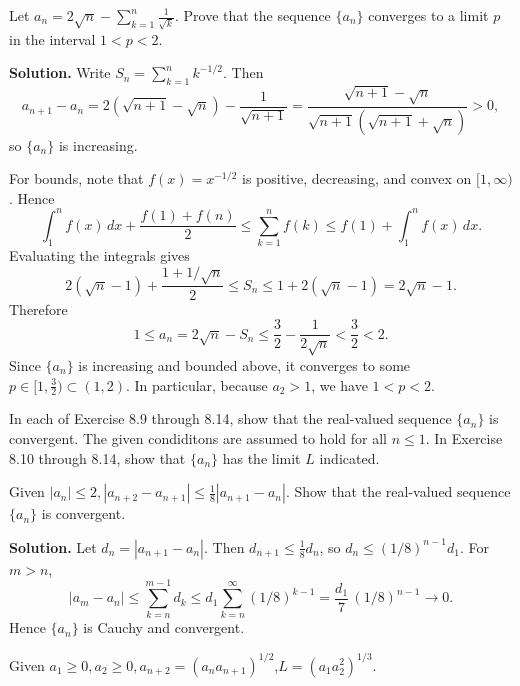 \begin{problembox}
Let \(a_n = 2\sqrt{n}-\sum_{k=1}^n \frac{1}{\sqrt{k}}\). Prove that the sequence \(\{a_n\}\) converges to a limit \(p\) in the interval \(1 < p < 2\).
\end{problembox}

\noindent\textbf{Solution.}
Write \(S_n=\sum_{k=1}^n k^{-1/2}\). Then
\[a_{n+1}-a_n = 2(\sqrt{n+1}-\sqrt{n})-\frac{1}{\sqrt{n+1}} = \frac{\sqrt{n+1}-\sqrt{n}}{\sqrt{n+1}(\sqrt{n+1}+\sqrt{n})} > 0,\]
so \(\{a_n\}\) is increasing.

For bounds, note that \(f(x)=x^{-1/2}\) is positive, decreasing, and convex on \([1,\infty)\). Hence
\[\int_{1}^{n} f(x)\,dx + \frac{f(1)+f(n)}{2} \le \sum_{k=1}^{n} f(k) \le f(1)+\int_{1}^{n} f(x)\,dx.\]
Evaluating the integrals gives
\[2(\sqrt{n}-1)+\frac{1+1/\sqrt{n}}{2} \le S_n \le 1+2(\sqrt{n}-1)=2\sqrt{n}-1.\]
Therefore
\[1 \le a_n = 2\sqrt{n}-S_n \le \frac{3}{2}-\frac{1}{2\sqrt{n}} < \frac{3}{2} < 2.\]
Since \(\{a_n\}\) is increasing and bounded above, it converges to some \(p\in[1,\tfrac{3}{2})\subset(1,2)\). In particular, because \(a_2>1\), we have \(1<p<2\).



\begin{tcolorbox}[colback=red!10,colframe=red!50,arc=3pt,boxrule=1pt]
In each of Exercise 8.9 through 8.14, show that the real-valued sequence $\{a_n\}$ is convergent. The given condiditons are assumed to hold for all $n\leq 1$. In Exercise 8.10 through 8.14, show that $\{a_n\}$ has the limit $L$ indicated.
\end{tcolorbox}


\begin{problembox}
Given \(|a_n| \leq 2, |a_{n+2} - a_{n+1}| \leq \frac{1}{8} |a_{n+1} - a_n|\). Show that the real-valued sequence \(\{a_n\}\) is convergent.
\end{problembox}

\noindent\textbf{Solution.}
Let \(d_n=|a_{n+1}-a_n|\). Then \(d_{n+1}\le \tfrac{1}{8}d_n\), so \(d_n\le (1/8)^{n-1} d_1\). For \(m>n\),
\[|a_m-a_n|\le \sum_{k=n}^{m-1} d_k \le d_1\sum_{k=n}^{\infty} (1/8)^{k-1}=\frac{d_1}{7}\,(1/8)^{n-1}\to 0.\]
Hence \(\{a_n\}\) is Cauchy and convergent.

\begin{problembox}
Given \(a_1 \geq 0, a_2 \geq 0, a_{n+2} = (a_n a_{n+1})^{1/2}\),\(L = (a_1 a_2^2)^{1/3}\).
\end{problembox}

